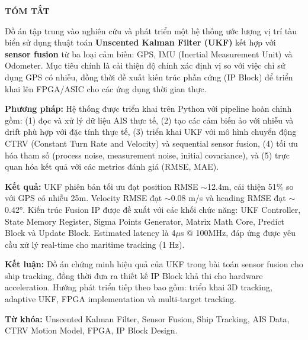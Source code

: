 \newpage
\thispagestyle{empty}
\begin{center}
{\LARGE \textbf{TÓM TẮT}}
\end{center}

\vspace{1cm}

Đồ án tập trung vào nghiên cứu và phát triển một hệ thống ước lượng vị trí tàu biển sử dụng thuật toán \textbf{Unscented Kalman Filter (UKF)} kết hợp với \textbf{sensor fusion} từ ba loại cảm biến: GPS, IMU (Inertial Measurement Unit) và Odometer. Mục tiêu chính là cải thiện độ chính xác định vị so với việc chỉ sử dụng GPS có nhiễu, đồng thời đề xuất kiến trúc phần cứng (IP Block) để triển khai lên FPGA/ASIC cho các ứng dụng thời gian thực.

\textbf{Phương pháp:} Hệ thống được triển khai trên Python với pipeline hoàn chỉnh gồm: (1) đọc và xử lý dữ liệu AIS thực tế, (2) tạo các cảm biến ảo với nhiễu và drift phù hợp với đặc tính thực tế, (3) triển khai UKF với mô hình chuyển động CTRV (Constant Turn Rate and Velocity) và sequential sensor fusion, (4) tối ưu hóa tham số (process noise, measurement noise, initial covariance), và (5) trực quan hóa kết quả với các metrics đánh giá (RMSE, MAE).

\textbf{Kết quả:} UKF phiên bản tối ưu đạt position RMSE $\sim$12.4m, cải thiện 51\% so với GPS có nhiễu 25m. Velocity RMSE đạt $\sim$0.08 m/s và heading RMSE đạt $\sim$0.42°. Kiến trúc Fusion IP được đề xuất với các khối chức năng: UKF Controller, State Memory Register, Sigma Points Generator, Matrix Math Core, Predict Block và Update Block. Estimated latency là 4$\mu$s @ 100MHz, đáp ứng được yêu cầu xử lý real-time cho maritime tracking (1 Hz).

\textbf{Kết luận:} Đồ án chứng minh hiệu quả của UKF trong bài toán sensor fusion cho ship tracking, đồng thời đưa ra thiết kế IP Block khả thi cho hardware acceleration. Hướng phát triển tiếp theo bao gồm: triển khai 3D tracking, adaptive UKF, FPGA implementation và multi-target tracking.

\vspace{0.5cm}

\textbf{Từ khóa:} Unscented Kalman Filter, Sensor Fusion, Ship Tracking, AIS Data, CTRV Motion Model, FPGA, IP Block Design.
